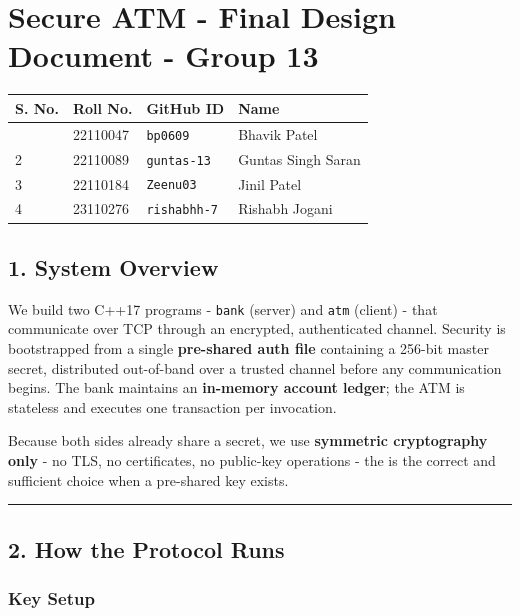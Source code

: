 \documentclass[
]{article}
\author{}
\date{}
\begin{document}
\hypertarget{secure-atm---design-document---group-13}{%
\section{Secure ATM - Final Design Document - Group
13}\label{secure-atm---design-document---group-13}}

\begin{longtable}[]{@{}llll@{}}
\toprule\noalign{}
S. No. & Roll No. & GitHub ID & Name \\
\midrule\noalign{}
\endhead
\bottomrule\noalign{}
\endlastfoot
1 & 22110047 & \texttt{bp0609} & Bhavik Patel \\
2 & 22110089 & \texttt{guntas-13} & Guntas Singh Saran \\
3 & 22110184 & \texttt{Zeenu03} & Jinil Patel \\
4 & 23110276 & \texttt{rishabhh-7} & Rishabh Jogani \\
\end{longtable}

\hypertarget{system-overview}{%
\subsection{1. System Overview}\label{system-overview}}

We build two C++17 programs - \texttt{bank} (server) and \texttt{atm}
(client) - that communicate over TCP through an encrypted, authenticated
channel. Security is bootstrapped from a single \textbf{pre-shared auth
file} containing a 256-bit master secret, distributed out-of-band over a
trusted channel before any communication begins. The bank maintains an
\textbf{in-memory account ledger}; the ATM is stateless and executes one
transaction per invocation.

Because both sides already share a secret, we use \textbf{symmetric
cryptography only} - no TLS, no certificates, no public-key operations -
the is the correct and sufficient choice when a pre-shared key exists.

\begin{center}\rule{0.5\linewidth}{0.5pt}\end{center}

\hypertarget{how-the-protocol-runs}{%
\subsection{2. How the Protocol Runs}\label{how-the-protocol-runs}}

\hypertarget{key-setup}{%
\subsubsection{Key Setup}\label{key-setup}}
\end{document}
